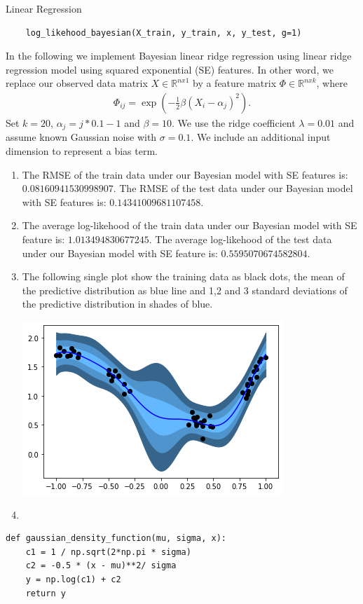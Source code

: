 \begin{task}{Linear Regression}
\begin{subtask}
\begin{lstlisting}
    log_likehood_bayesian(X_train, y_train, x, y_test, g=1)
\end{lstlisting}
\end{subtask}
\begin{subtask}
In the following we implement Bayesian linear ridge regression using linear ridge regression model using squared exponential (SE) features. In other word, we replace our observed data matrix $X \in \mathbb{R}^{nx1}$ by a feature matrix $\Phi \in \mathbb{R}^{nxk}$, where
\begin{align*}
\Phi_{ij} = \exp(- \frac{1}{2} \beta (X_i - \alpha_j)^2).
\end{align*}
Set $k = 20$, $\alpha_j = j * 0.1 - 1$ and $\beta = 10$. We use the ridge coefficient $\lambda = 0.01$ and assume known Gaussian noise with $\sigma = 0.1$. We include an additional input dimension to represent a bias term. 
\begin{enumerate}
\item The RMSE of the train data under our Bayesian model with SE features is: $0.08160941530998907$. The RMSE of the test data under our Bayesian model with SE features is: $0.14341009681107458$.
\item The average log-likehood of the train data under our Bayesian model with SE feature is: $1.013494830677245$. The average log-likehood of the test data under our Bayesian model with SE feature is:
$0.5595070674582804$.
\item The following single plot show the training data as black dots, the mean of the predictive distribution as blue line and 1,2 and 3 standard deviations of the predictive distribution in shades of blue.
\begin{center}
\includegraphics{Figure_1e.png}
\end{center}
\item 
\end{enumerate}
\begin{lstlisting}
def gaussian_density_function(mu, sigma, x):
    c1 = 1 / np.sqrt(2*np.pi * sigma)
    c2 = -0.5 * (x - mu)**2/ sigma
    y = np.log(c1) + c2
    return y    


\end{lstlisting}
\end{subtask}
\end{task}
